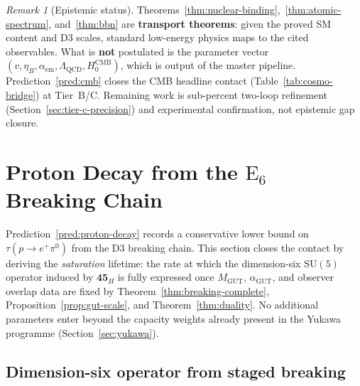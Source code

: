 \documentclass[aps,prd,onecolumn,amsmath,amssymb,nofootinbib,11pt]{revtex4-2}
\numberwithin{equation}{section}
\theoremstyle{plain}
\theoremstyle{definition}
\theoremstyle{remark}
\newtheorem{remark}[theorem]{Remark}
\newcommand{\E}[1]{\mathrm{E}_{#1}}
\begin{document}
\begin{remark}[Epistemic status]
Theorems~\ref{thm:nuclear-binding},~\ref{thm:atomic-spectrum},
and~\ref{thm:bbn} are \textbf{transport theorems}: given the proved SM
content and D3 scales, standard low-energy physics maps to the cited
observables. What is \textbf{not} postulated is the parameter vector
$(v,\eta_B,\alpha_{\mathrm{em}},\Lambda_{\mathrm{QCD}},H_0^{\mathrm{CMB}})$,
which is output of the master pipeline. Prediction~\ref{pred:cmb} closes the CMB headline contact
(Table~\ref{tab:cosmo-bridge}) at Tier~B/C. Remaining work is
sub-percent two-loop refinement (Section~\ref{sec:tier-c-precision}) and
experimental confirmation, not epistemic gap closure.
\end{remark}%
\section{Proton Decay from the $\E{6}$ Breaking Chain}
\label{sec:proton-decay}

Prediction~\ref{pred:proton-decay} records a conservative lower bound on
$\tau(p\to e^+\pi^0)$ from the D3 breaking chain. This section closes the
contact by deriving the \emph{saturation} lifetime: the rate at which the
dimension-six $\mathrm{SU}(5)$ operator induced by $\mathbf{45}_H$ is fully
expressed once $M_{\mathrm{GUT}}$, $\alpha_{\mathrm{GUT}}$, and observer
overlap data are fixed by Theorem~\ref{thm:breaking-complete},
Proposition~\ref{prop:gut-scale}, and Theorem~\ref{thm:duality}. No
additional parameters enter beyond the capacity weights already present in
the Yukawa programme (Section~\ref{sec:yukawa}).

\subsection{Dimension-six operator from staged breaking}
\label{sec:proton-decay:operator}
\end{document}
